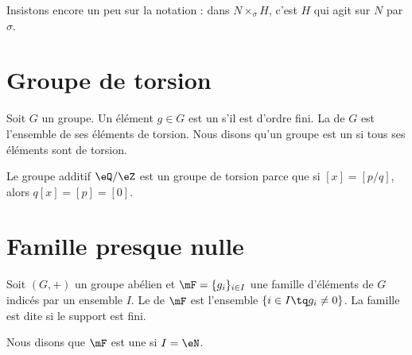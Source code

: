 Insistons encore un peu sur la notation : dans \( N\times_{\sigma}H\), c'est \( H\) qui agit sur \( N\) par \( \sigma\).

\section{Groupe de torsion}

Soit \( G\) un groupe. Un élément \( g\in G\) est un  s'il est d'ordre fini. La  de \( G\) est l'ensemble de ses éléments de torsion. Nous disons qu'un groupe est un  si tous ses éléments sont de torsion.

\begin{example}
    Le groupe additif \( \eQ/\eZ\) est un groupe de torsion parce que si \( [x]=[p/q]\), alors \( q[x]=[p]=[0]\).
\end{example}

\section{Famille presque nulle}

Soit \( (G,+)\) un groupe abélien et \( \mF=\{ g_i \}_{i\in I}\) une famille d'éléments de \( G\) indicés par un ensemble \( I\). Le  de \( \mF\) est l'ensemble \( \{ i\in I\tq g_i\neq 0 \}\). La famille est dite  si le support est fini.

Nous disons que \( \mF\) est une  si \( I=\eN\).

